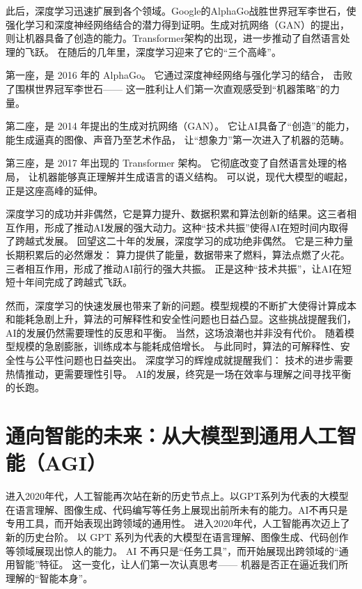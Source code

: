 此后，深度学习迅速扩展到各个领域。Google的AlphaGo战胜世界冠军李世石，使强化学习和深度神经网络结合的潜力得到证明。生成对抗网络（GAN）的提出，则让机器具备了创造的能力。Transformer架构的出现，进一步推动了自然语言处理的飞跃。
在随后的几年里，深度学习迎来了它的“三个高峰”。  

第一座，是 2016 年的 AlphaGo。  
它通过深度神经网络与强化学习的结合，  
击败了围棋世界冠军李世石——  
这一胜利让人们第一次直观感受到“机器策略”的力量。  

第二座，是 2014 年提出的生成对抗网络（GAN）。  
它让AI具备了“创造”的能力，  
能生成逼真的图像、声音乃至艺术作品，  
让“想象力”第一次进入了机器的范畴。  

第三座，是 2017 年出现的 Transformer 架构。  
它彻底改变了自然语言处理的格局，  
让机器能够真正理解并生成语言的语义结构。  
可以说，现代大模型的崛起，正是这座高峰的延伸。  

深度学习的成功并非偶然，它是算力提升、数据积累和算法创新的结果。这三者相互作用，形成了推动AI发展的强大动力。这种“技术共振”使得AI在短时间内取得了跨越式发展。
回望这二十年的发展，深度学习的成功绝非偶然。  
它是三种力量长期积累后的必然爆发：  
算力提供了能量，数据带来了燃料，算法点燃了火花。  
三者相互作用，形成了推动AI前行的强大共振。  
正是这种“技术共振”，让AI在短短十年间完成了跨越式飞跃。  

然而，深度学习的快速发展也带来了新的问题。模型规模的不断扩大使得计算成本和能耗急剧上升，算法的可解释性和安全性问题也日益凸显。这些挑战提醒我们，AI的发展仍然需要理性的反思和平衡。
当然，这场浪潮也并非没有代价。  
随着模型规模的急剧膨胀，训练成本与能耗成倍增长。  
与此同时，算法的可解释性、安全性与公平性问题也日益突出。  
深度学习的辉煌成就提醒我们：  
技术的进步需要热情推动，更需要理性引导。  
AI的发展，终究是一场在效率与理解之间寻找平衡的长跑。  


\section{通向智能的未来：从大模型到通用人工智能（AGI）}

进入2020年代，人工智能再次站在新的历史节点上。以GPT系列为代表的大模型在语言理解、图像生成、代码编写等任务上展现出前所未有的能力。AI不再只是专用工具，而开始表现出跨领域的通用性。
进入2020年代，人工智能再次迈上了新的历史台阶。  
以 GPT 系列为代表的大模型在语言理解、图像生成、代码创作等领域展现出惊人的能力。  
AI 不再只是“任务工具”，而开始展现出跨领域的“通用智能”特征。  
这一变化，让人们第一次认真思考——  
机器是否正在逼近我们所理解的“智能本身”。  

